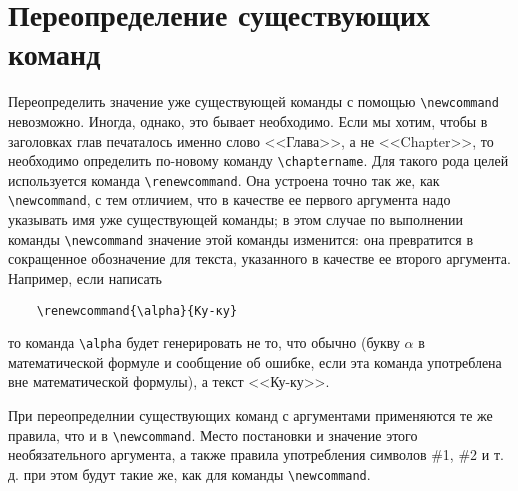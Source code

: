 \chapter{Переопределение существующих команд}

Переопределить значение уже существующей команды с помощью \verb"\newcommand" невозможно. Иногда, однако, это бывает необходимо. Если мы хотим, чтобы в заголовках глав печаталось именно слово <<Глава>>, а не <<Chapter>>, то необходимо определить по-новому команду \verb"\chaptername". Для такого рода целей используется команда \verb"\renewcommand". Она устроена точно так же, как \verb"\newcommand", с тем отличием, что в качестве ее первого аргумента надо указывать имя уже существующей команды; в этом случае по выполнении команды \verb"\newcommand" значение этой команды изменится: она превратится в сокращенное обозначение для текста, указанного в качестве ее второго аргумента. Например, если написать

\begin{verbatim}
	\renewcommand{\alpha}{Ку-ку}
\end{verbatim}
то команда \verb"\alpha" будет генерировать не то, что обычно (букву $\alpha$ в математической формуле и сообщение об ошибке, если эта команда употреблена вне математической формулы), а текст <<Ку-ку>>.

При переопределнии существующих команд с аргументами применяются те же правила, что и в \verb"\newcommand". Место постановки и значение этого необязательного аргумента, а также правила употребления символов \#1, \#2 и т.\,д. при этом будут такие же, как для команды \verb"\newcommand".